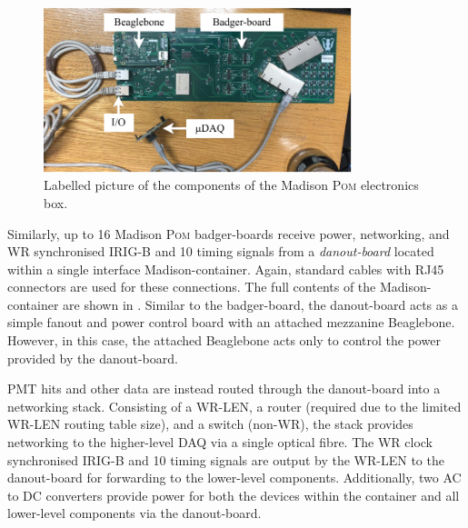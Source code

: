 \begin{figure} %
    \includegraphics[width=0.8\textwidth]{diagrams/5-daq/madison_plane.pdf}
    \caption[Labelled picture of the components of the Madison \textsc{Pom} electronics box]
    {Labelled picture of the components of the Madison \textsc{Pom} electronics box.}
    \label{fig:madison_plane}
\end{figure}

Similarly, up to 16 Madison \textsc{Pom} badger-boards receive power, networking, and WR
synchronised IRIG-B and \SI{10}{} timing signals from a \emph{danout-board} located
within a single interface Madison-container. Again, standard cables with RJ45 connectors are used
for these connections. The full contents of the Madison-container are shown in
. Similar to the badger-board, the danout-board acts as a simple fanout
and power control board with an attached mezzanine Beaglebone. However, in this case, the attached
Beaglebone acts only to control the power provided by the danout-board.

PMT hits and other data are instead routed through the danout-board into a networking stack.
Consisting of a WR-LEN, a router (required due to the limited WR-LEN routing table size), and a
switch (non-WR), the stack provides networking to the higher-level DAQ via a single optical fibre.
The WR clock synchronised IRIG-B and \SI{10}{} timing signals are output by the WR-LEN
to the danout-board for forwarding to the lower-level components. Additionally, two AC to DC
converters provide power for both the devices within the container and all lower-level components
via the danout-board.

